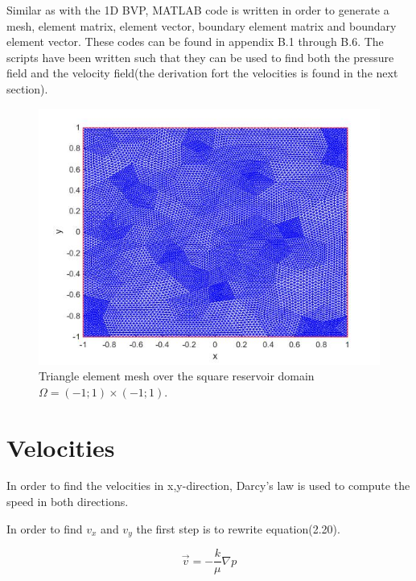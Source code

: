 \documentclass[a4paper]{report}
\begin{document}
Similar as with the 1D BVP, MATLAB code is written in order to generate a mesh, element matrix, element vector, boundary element matrix and boundary element vector. These codes can be found in appendix B.1 through B.6. The scripts have been written such that they can be used to find both the pressure field and the velocity field(the derivation fort the velocities is found in the next section).


\begin{figure}[h]
	\centering
	\includegraphics[width=150mm]{finest_mesh.jpg}
	\caption{Triangle element mesh over the square reservoir domain $\Omega=(-1;1)\times (-1;1)$. \label{overflow}}
\end{figure}




\section{Velocities}

In order to find the velocities in x,y-direction, Darcy's law is used to compute the speed in both directions.


In order to find $v_x$ and $v_y$ the first step is to rewrite equation(2.20).

\begin{equation}
\vec{v}=-\frac{k}{\mu}\nabla p
\end{equation}
\end{document}
